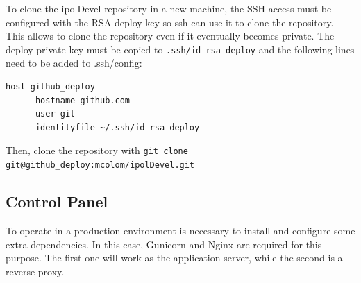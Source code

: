 To clone the ipolDevel repository in a new machine, the SSH access must be configured with the RSA deploy key so ssh can use it to clone the repository. This allows to clone the repository even if it eventually becomes private.
%
The deploy private key must be copied to {\tt .ssh/id\_rsa\_deploy} and the following lines need to be added to .ssh/config:

\begin{verbatim}
host github_deploy
      hostname github.com
      user git
      identityfile ~/.ssh/id_rsa_deploy
\end{verbatim}

Then, clone the repository with {\tt git clone git@github\_deploy:mcolom/ipolDevel.git}


\subsection{Control Panel}
To operate in a production environment is necessary to install and configure some extra dependencies. In this case, Gunicorn and Nginx are 
required for this purpose. The first one will work as the application server, while the second is a reverse proxy. 

